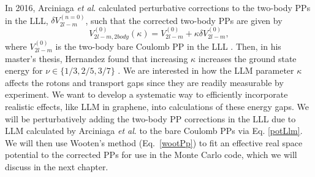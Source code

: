         In 2016, Arciniaga \textit{et al}. calculated perturbative corrections to the two-body PPs in the LLL, $\delta V^{(n=0)}_{2l-m}$, such that the corrected two-body PPs are given by
        \begin{equation} \label{potLlm}
        V^{(0)}_{2l-m,2body}(\kappa) = V^{(0)}_{2l-m} + \kappa\delta V^{(0)}_{2l-m},
        \end{equation}
        where $V^{(0)}_{2l-m}$ is the two-body bare Coulomb PP in the LLL \cite{arciniaga}. Then, in his master's thesis, Hernandez found that increasing $\kappa$ increases the ground state energy for $\nu\in\{1/3,2/5,3/7\}$ \cite{uriel}. We are interested in how the LLM parameter $\kappa$ affects the rotons and transport gaps since they are readily measurable by experiment. We want to develop a systematic way to efficiently incorporate realistic effects, like LLM in graphene, into calculations of these energy gaps. We will be perturbatively adding the two-body PP corrections in the LLL due to LLM calculated by Arciniaga \textit{et al}. to the bare Coulomb PPs via Eq. \ref{potLlm}. We will then use Wooten's method (Eq.~\ref{wootPp}) to fit an effective real space potential to the corrected PPs for use in the Monte Carlo code, which we will discuss in the next chapter.

\singlespacing